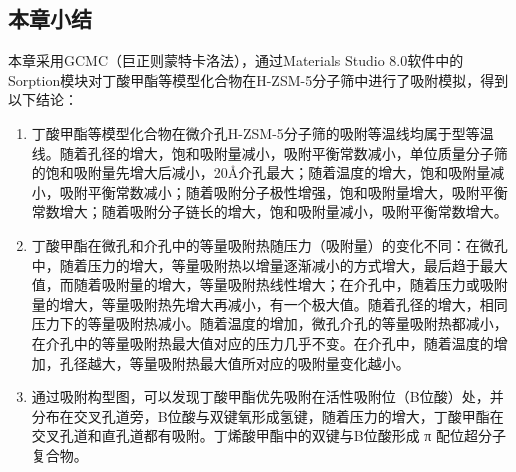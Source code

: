 \subsection{本章小结}
\par{本章采用GCMC（巨正则蒙特卡洛法），通过Materials Studio 8.0软件中的Sorption模块对丁酸甲酯等模型化合物在H-ZSM-5分子筛中进行了吸附模拟，得到以下结论：}
\begin{enumerate}
    \item 丁酸甲酯等模型化合物在微介孔H-ZSM-5分子筛的吸附等温线均属于型等温线。随着孔径的增大，饱和吸附量减小，吸附平衡常数减小，单位质量分子筛的饱和吸附量先增大后减小，20Å介孔最大；随着温度的增大，饱和吸附量减小，吸附平衡常数减小；随着吸附分子极性增强，饱和吸附量增大，吸附平衡常数增大；随着吸附分子链长的增大，饱和吸附量减小，吸附平衡常数增大。
    \item 丁酸甲酯在微孔和介孔中的等量吸附热随压力（吸附量）的变化不同：在微孔中，随着压力的增大，等量吸附热以增量逐渐减小的方式增大，最后趋于最大值，而随着吸附量的增大，等量吸附热线性增大；在介孔中，随着压力或吸附量的增大，等量吸附热先增大再减小，有一个极大值。随着孔径的增大，相同压力下的等量吸附热减小。随着温度的增加，微孔介孔的等量吸附热都减小，在介孔中的等量吸附热最大值对应的压力几乎不变。在介孔中，随着温度的增加，孔径越大，等量吸附热最大值所对应的吸附量变化越小。
    \item 通过吸附构型图，可以发现丁酸甲酯优先吸附在活性吸附位（B位酸）处，并分布在交叉孔道旁，B位酸与双键氧形成氢键，随着压力的增大，丁酸甲酯在交叉孔道和直孔道都有吸附。丁烯酸甲酯中的双键与B位酸形成 π 配位超分子复合物。
\end{enumerate}
